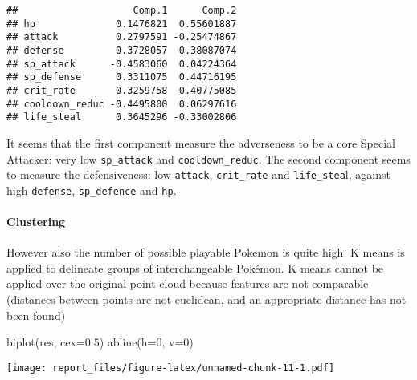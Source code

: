 \documentclass[
]{article}
\newenvironment{Shaded}{\begin{snugshade}}{\end{snugshade}}
\newcommand{\AttributeTok}[1]{\textcolor[rgb]{0.77,0.63,0.00}{#1}}
\newcommand{\DecValTok}[1]{\textcolor[rgb]{0.00,0.00,0.81}{#1}}
\newcommand{\FloatTok}[1]{\textcolor[rgb]{0.00,0.00,0.81}{#1}}
\newcommand{\FunctionTok}[1]{\textcolor[rgb]{0.00,0.00,0.00}{#1}}
\newcommand{\NormalTok}[1]{#1}
\begin{document}
\begin{verbatim}
##                    Comp.1      Comp.2
## hp              0.1476821  0.55601887
## attack          0.2797591 -0.25474867
## defense         0.3728057  0.38087074
## sp_attack      -0.4583060  0.04224364
## sp_defense      0.3311075  0.44716195
## crit_rate       0.3259758 -0.40775085
## cooldown_reduc -0.4495800  0.06297616
## life_steal      0.3645296 -0.33002806
\end{verbatim}

It seems that the first component measure the adverseness to be a core
Special Attacker: very low \texttt{sp\_attack} and
\texttt{cooldown\_reduc}. The second component seems to measure the
defensiveness: low \texttt{attack}, \texttt{crit\_rate} and
\texttt{life\_stea}l, against high \texttt{defense},
\texttt{sp\_defence} and \texttt{hp}.

\hypertarget{clustering}{%
\paragraph{Clustering}\label{clustering}}

However also the number of possible playable Pokemon is quite high. K
means is applied to delineate groups of interchangeable Pokémon. K means
cannot be applied over the original point cloud because features are not
comparable (distances between points are not euclidean, and an
appropriate distance has not been found)

\begin{Shaded}
\begin{Highlighting}[]
\FunctionTok{biplot}\NormalTok{(res, }\AttributeTok{cex=}\FloatTok{0.5}\NormalTok{)}
\FunctionTok{abline}\NormalTok{(}\AttributeTok{h=}\DecValTok{0}\NormalTok{, }\AttributeTok{v=}\DecValTok{0}\NormalTok{)}
\end{Highlighting}
\end{Shaded}

\texttt{[image: report\_files/figure-latex/unnamed-chunk-11-1.pdf]}
\end{document}
